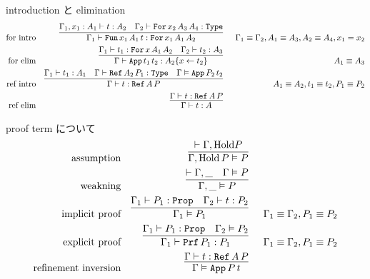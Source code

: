 \begin{itembox}[l]{introduction と elimination}
\begin{align*}
  \text{for intro} &&
  \infer[]{
    \Gamma_1 \vdash \texttt{Fun} \, x_1 \, A_1 \, t : \texttt{For} \, x_1 \, A_1 \, A_2}{\Gamma_1 , x_1 : A_1 \vdash t : A_2 & \Gamma_2 \vdash \texttt{For} \, x_2 \, A_3 \, A_4 : \texttt{Type}
  } && \Gamma_1 \equiv \Gamma_2 , A_1 \equiv A_3 , A_2 \equiv A_4 , x_1 = x_2 \\
  \text{for elim} &&
  \infer[]{
    \Gamma \vdash \texttt{App} \, t_1 \, t_2 : A_2\{x \leftarrow t_2\}}{\Gamma_1 \vdash t_1 : \texttt{For} \, x \, A_1 \, A_2 & \Gamma_2 \vdash t_2 : A_3
  } && A_1 \equiv A_3 \\
  \text{ref intro} &&
  \infer[]{
    \Gamma \vdash t : \texttt{Ref} \, A \, P}{\Gamma_1 \vdash t_1 : A_1 & \Gamma \vdash \texttt{Ref} \, A_2 \, P_1 : \texttt{Type} & \Gamma \vDash \texttt{App} \, P_2 \, t_2
  } && A_1 \equiv A_2 , t_1 \equiv t_2 , P_1 \equiv P_2 \\
  \text{ref elim} &&
  \infer[]{
    \Gamma \vdash t : A}{\Gamma \vdash t : \texttt{Ref} \, A \, P}
\end{align*}
\end{itembox}

\begin{itembox}[l]{proof term について}
\begin{align*}
  \text{assumption} &&
  \infer[]{\Gamma , \text{Hold} \, P \vDash P}{\vdash \Gamma , \text{Hold} P} \\
  \text{weakning} &&
  \infer[]{\Gamma , \_ \vDash P}{ \vdash \Gamma , \_ & \Gamma \vDash P} \\
  \text{implicit proof} &&
  \infer[]{
    \Gamma_1 \vDash P_1}{\Gamma_1 \vdash P_1 : \texttt{Prop} & \Gamma _2 \vdash t : P_2
  } && \Gamma_1 \equiv \Gamma_2 , P_1 \equiv P_2 \\
  \text{explicit proof} &&
  \infer[]{
    \Gamma_1 \vdash \texttt{Prf} \, P_1 : P_1}{\Gamma_1 \vdash P_1 : \texttt{Prop} &\Gamma_2 \vDash P_2
  } && \Gamma_1 \equiv \Gamma_2 , P_1 \equiv P_2 \\
  \text{refinement inversion} && 
  \infer[]{\Gamma \vDash \texttt{App} \, P \, t}{\Gamma \vdash t : \texttt{Ref} \, A \, P}
\end{align*}
\end{itembox}